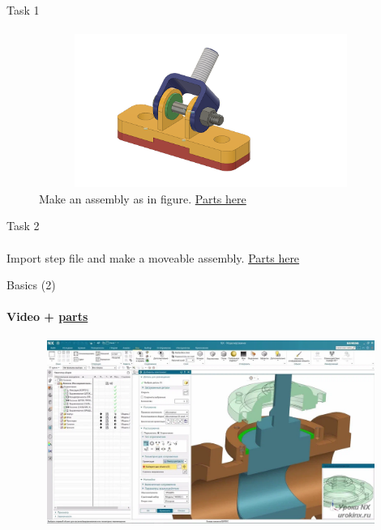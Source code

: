 \documentclass[aspectratio=169]{beamer}
\newcommand{\fbckg}[1]{\usebackgroundtemplate{\texttt{[image: \#1]}}}%
\begin{document}
\begin{frame}[t]{Task 1}
\framesubtitle{}
    \begin{figure}[H]
        \centering\includegraphics[height=5cm,width=1\textwidth,keepaspectratio]{task1.png}
        \caption*{Make an assembly as in figure. \href{https://disk.yandex.ru/d/7ZBj1dYl2SWxjA}{Parts here}}
        \label{fig:task1.png}
    \end{figure}
\end{frame}

\begin{frame}[t]{Task 2}
    \framesubtitle{}
        Import step file and make a moveable assembly. \href{https://disk.yandex.ru/d/7itUHTJBdrYhzg}{Parts here}
    \end{frame}

    \begin{frame}[t]{Basics (2)}
        \framesubtitle{Video + \href{https://disk.yandex.ru/d/7ZBj1dYl2SWxjA}{parts}}
        \vspace{-0.6cm}
        \begin{figure}[H]
            \href{https://disk.yandex.ru/i/kbz5Hqkpsvte8w}{
                \centering\includegraphics[height=6cm,width=1\textwidth,keepaspectratio]{2.png}}
            \label{fig:2}
        \end{figure}
    \end{frame}

\fbckg{fibeamer/figs/last_page.png}
\frame[plain]{}
\end{document}
